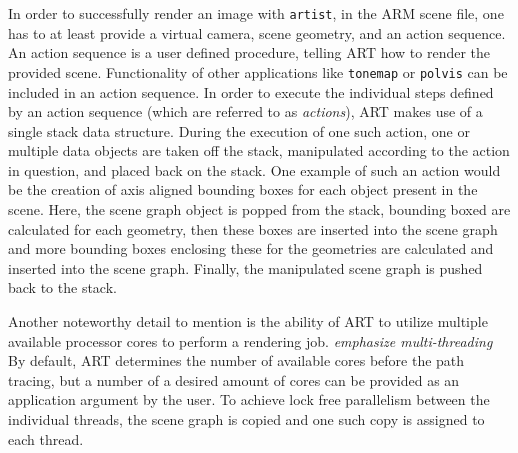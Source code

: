 In order to successfully render an image with \texttt{artist}, in the ARM scene file, one has to at least provide a virtual camera, scene geometry, and an action sequence. An action sequence is a user defined procedure, telling ART how to render the provided scene. Functionality of other applications like \texttt{tonemap} or \texttt{polvis}  can be included in an action sequence.
In order to execute the individual steps  defined by an action sequence (which are referred to as \emph{actions}), ART makes use of a single stack data structure. During the execution of one such action, one or multiple data objects are taken off the stack, manipulated according to the action in question, and placed back on the stack. One example of such an action would be the creation of axis aligned bounding boxes for each object present in the scene. Here, the scene graph object is popped from the stack, bounding boxed are calculated for each geometry, then these boxes are inserted into the scene graph and more bounding boxes enclosing these for the geometries are calculated and inserted into the scene graph. Finally, the manipulated scene graph is pushed back to the stack.

Another noteworthy detail to mention is the ability of ART to utilize multiple available processor cores to perform a rendering job. \emph{emphasize multi-threading} By default, ART determines the number of available cores before the path tracing, but a number of a desired amount of cores can be provided as an application argument by the user. 
To achieve lock free parallelism between the individual threads, the scene graph is copied and one such copy is assigned to each thread. 
 

